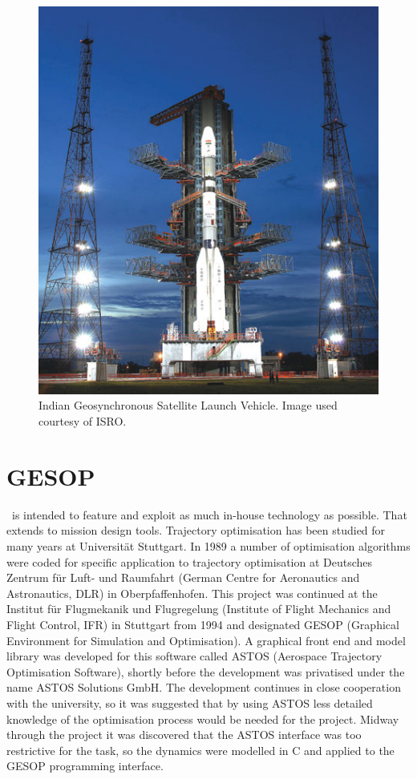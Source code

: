 \begin{figure} [h]
\centering
\includegraphics[scale=0.50]{Images/GSLV2.jpg}
\caption{Indian Geosynchronous Satellite Launch Vehicle. Image used courtesy of ISRO.} \label{fig:GSLV}
\end{figure}

\section{GESOP} \label{sec:GESOP}

\BW\ is intended to feature and exploit as much in-house technology as possible. That extends to mission design tools. 
Trajectory optimisation has been studied for many years at Universit\"{a}t Stuttgart. In 1989 a number of optimisation algorithms were coded for specific application to trajectory optimisation at Deutsches Zentrum f\"{u}r Luft- und Raumfahrt (German Centre for Aeronautics and Astronautics, DLR) in Oberpfaffenhofen. This project was continued at the Institut f\"{u}r Flugmekanik und Flugregelung (Institute of Flight Mechanics and Flight Control, IFR) in Stuttgart from 1994 and designated GESOP (Graphical Environment for Simulation and Optimisation). A graphical front end and model library was developed for this software called ASTOS (Aerospace Trajectory Optimisation Software), shortly before the development was privatised under the name ASTOS Solutions GmbH. The development continues in close cooperation with the university, so it was suggested that by using ASTOS less detailed knowledge of the optimisation process would be needed for the project. Midway through the project it was discovered that the ASTOS interface was too restrictive for the task, so the dynamics were modelled in C and applied to the GESOP programming interface.

